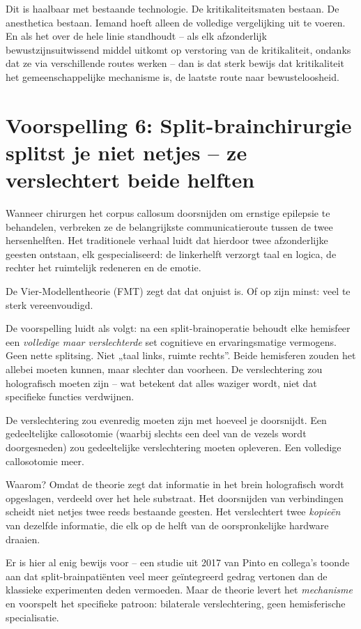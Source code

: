 \documentclass[11pt, twoside, openright]{book}
\begin{document}
Dit is haalbaar met bestaande technologie. De kritikaliteitsmaten bestaan. De anesthetica bestaan. Iemand hoeft alleen de volledige vergelijking uit te voeren. En als het over de hele linie standhoudt -- als elk afzonderlijk bewustzijnsuitwissend middel uitkomt op verstoring van de kritikaliteit, ondanks dat ze via verschillende routes werken -- dan is dat sterk bewijs dat kritikaliteit het gemeenschappelijke mechanisme is, de laatste route naar bewusteloosheid.

\section*{Voorspelling 6: Split-brainchirurgie splitst je niet netjes -- ze verslechtert beide helften}

Wanneer chirurgen het corpus callosum doorsnijden om ernstige epilepsie te behandelen, verbreken ze de belangrijkste communicatieroute tussen de twee hersenhelften. Het traditionele verhaal luidt dat hierdoor twee afzonderlijke geesten ontstaan, elk gespecialiseerd: de linkerhelft verzorgt taal en logica, de rechter het ruimtelijk redeneren en de emotie.

De Vier-Modellentheorie (FMT) zegt dat dat onjuist is. Of op zijn minst: veel te sterk vereenvoudigd.

De voorspelling luidt als volgt: na een split-brainoperatie behoudt elke hemisfeer een \textit{volledige maar verslechterde} set cognitieve en ervaringsmatige vermogens. Geen nette splitsing. Niet „taal links, ruimte rechts”. Beide hemisferen zouden het allebei moeten kunnen, maar slechter dan voorheen. De verslechtering zou holografisch moeten zijn -- wat betekent dat alles waziger wordt, niet dat specifieke functies verdwijnen.

De verslechtering zou evenredig moeten zijn met hoeveel je doorsnijdt. Een gedeeltelijke callosotomie (waarbij slechts een deel van de vezels wordt doorgesneden) zou gedeeltelijke verslechtering moeten opleveren. Een volledige callosotomie meer.

Waarom? Omdat de theorie zegt dat informatie in het brein holografisch wordt opgeslagen, verdeeld over het hele substraat. Het doorsnijden van verbindingen scheidt niet netjes twee reeds bestaande geesten. Het verslechtert twee \textit{kopieën} van dezelfde informatie, die elk op de helft van de oorspronkelijke hardware draaien.

Er is hier al enig bewijs voor -- een studie uit 2017 van Pinto en collega's toonde aan dat split-brainpatiënten veel meer geïntegreerd gedrag vertonen dan de klassieke experimenten deden vermoeden. Maar de theorie levert het \textit{mechanisme} en voorspelt het specifieke patroon: bilaterale verslechtering, geen hemisferische specialisatie.
\end{document}
